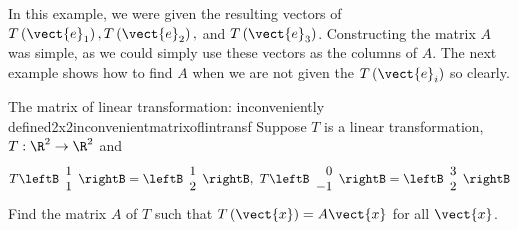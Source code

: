In this example, we were given the resulting vectors of $T \left(\vect{e}_1 \right), 
T \left(\vect{e}_2 \right),$ and $T \left(\vect{e}_3 \right)$. Constructing the matrix $A$ was simple, as we
could simply use these vectors as the columns of $A$. The next example shows how to find $A$ when we are not given the $T \left(\vect{e}_i \right)$ so clearly. 

\begin{example}{The matrix of linear transformation: inconveniently \\ defined}{2x2inconvenientmatrixoflintransf}
Suppose $T$ is a linear transformation, $T:\R^{2}\rightarrow \R^{2}$ and
\begin{equation*}
T\leftB
\begin{array}{r}
1 \\
1
\end{array}
\rightB =\leftB
\begin{array}{r}
1 \\
2
\end{array}
\rightB ,\ T\leftB
\begin{array}{r}
0 \\
-1 
\end{array}
\rightB =\leftB
\begin{array}{r}
3 \\
2
\end{array}
\rightB
\end{equation*}
Find the matrix $A$ of $T$ such that $T \left( \vect{x} \right)=A\vect{x}$  for all $\vect{x}$.
\end{example}


